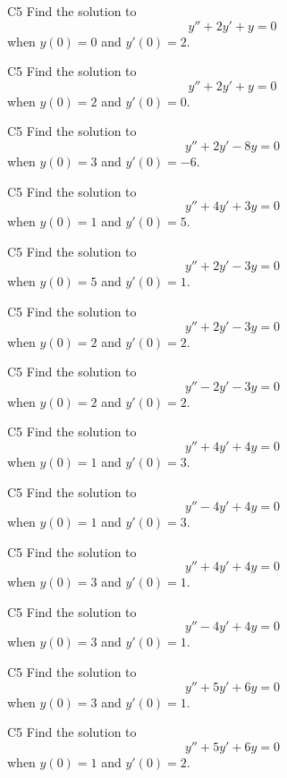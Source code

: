 \begin{problem}{C5}
Find the solution to
\[
y'' + 2y' + y = 0 
\]
when \(y(0)=0\) and \(y'(0)=2\).
\end{problem}

\begin{problem}{C5}
Find the solution to
\[
y'' + 2y' + y = 0 
\]
when \(y(0)=2\) and \(y'(0)=0\).
\end{problem}

\begin{problem}{C5}
Find the solution to
\[
y'' + 2y' - 8y = 0
\]
when \(y(0)=3\) and \(y'(0)=-6\).
\end{problem}

\begin{problem}{C5}
Find the solution to
\[
y'' + 4y' + 3y = 0
\]
when \(y(0)=1\) and \(y'(0)=5\).
\end{problem}

\begin{problem}{C5}
Find the solution to
\[
y'' + 2y' - 3y = 0
\]
when \(y(0)=5\) and \(y'(0)=1\).
\end{problem}

\begin{problem}{C5}
Find the solution to
\[
y'' + 2y' - 3y = 0
\]
when \(y(0)=2\) and \(y'(0)=2\).
\end{problem}

\begin{problem}{C5}
Find the solution to
\[
y'' - 2y' - 3y = 0
\]
when \(y(0)=2\) and \(y'(0)=2\).
\end{problem}

\begin{problem}{C5}
Find the solution to
\[
y'' + 4y' + 4y = 0
\]
when \(y(0)=1\) and \(y'(0)=3\).
\end{problem}

\begin{problem}{C5}
Find the solution to
\[
y'' - 4y' + 4y = 0
\]
when \(y(0)=1\) and \(y'(0)=3\).
\end{problem}

\begin{problem}{C5}
Find the solution to
\[
y'' + 4y' + 4y = 0
\]
when \(y(0)=3\) and \(y'(0)=1\).
\end{problem}

\begin{problem}{C5}
Find the solution to
\[
y'' - 4y' + 4y = 0
\]
when \(y(0)=3\) and \(y'(0)=1\).
\end{problem}

\begin{problem}{C5}
Find the solution to
\[
y'' + 5y' + 6y = 0
\]
when \(y(0)=3\) and \(y'(0)=1\).
\end{problem}

\begin{problem}{C5}
Find the solution to
\[
y'' + 5y' + 6y = 0
\]
when \(y(0)=1\) and \(y'(0)=2\).
\end{problem}


